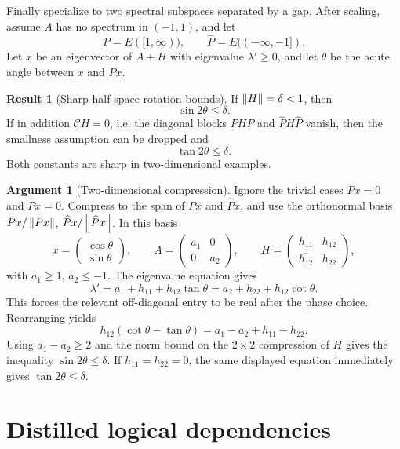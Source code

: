 \documentclass[11pt]{article}
\newcommand{\Pinch}{\mathscr{C}}
\newcommand{\Comp}[1]{\widehat{#1}}
\newcommand{\Pinch}{\mathcal{D}}
\newcommand{\Comp}[1]{#1^{\perp}}
\newcommand{\hlam}{\lambda'}
\newcommand{\Phat}{\Comp{P}}
\theoremstyle{definition}
\newtheorem{result}[definition]{Result}
\newtheorem{argument}[definition]{Argument}
\begin{document}
Finally specialize to two spectral subspaces separated by a gap.  After scaling,
assume \(A\) has no spectrum in \((-1,1)\), and let
\[
  P=E([1,\infty)), \qquad \Phat=E((-
\infty,-1]).
\]
Let \(x\) be an eigenvector of \(A+H\) with eigenvalue \(\hlam\ge 0\), and let
\(\theta\) be the acute angle between \(x\) and \(Px\).

\begin{result}[Sharp half-space rotation bounds]
If \(\norm{H}=\delta<1\), then
\[
  \sin 2\theta \le \delta.
\]
If in addition \(\Pinch H=0\), i.e. the diagonal blocks \(PHP\) and
\(\Phat H\Phat\) vanish, then the smallness assumption can be dropped and
\[
  \tan 2\theta \le \delta.
\]
Both constants are sharp in two-dimensional examples.
\end{result}

\begin{argument}[Two-dimensional compression]
Ignore the trivial cases \(Px=0\) and \(\Phat x=0\).  Compress to the span of
\(Px\) and \(\Phat x\), and use the orthonormal basis
\(Px/\norm{Px}\), \(\Phat x/\norm{\Phat x}\).  In this basis
\[
  x=\begin{pmatrix}\cos\theta\\ \sin\theta\end{pmatrix},
  \qquad
  A=\begin{pmatrix}a_1&0\\0&a_2\end{pmatrix},
  \qquad
  H=\begin{pmatrix}h_{11}&h_{12}\\\overline{h_{12}}&h_{22}\end{pmatrix},
\]
with \(a_1\ge 1\), \(a_2\le -1\).  The eigenvalue equation gives
\[
  \hlam=a_1+h_{11}+h_{12}\tan\theta
  =a_2+h_{22}+h_{12}\cot\theta.
\]
This forces the relevant off-diagonal entry to be real after the phase choice.
Rearranging yields
\[
  h_{12}(\cot\theta-\tan\theta)=a_1-a_2+h_{11}-h_{22}.
\]
Using \(a_1-a_2\ge2\) and the norm bound on the \(2\times2\) compression of
\(H\) gives the inequality \(\sin2\theta\le\delta\).  If
\(h_{11}=h_{22}=0\), the same displayed equation immediately gives
\(\tan2\theta\le\delta\).
\end{argument}

\section{Distilled logical dependencies}
\end{document}
